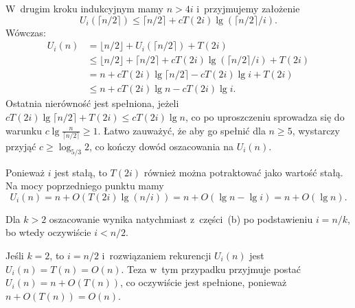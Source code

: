 W~drugim kroku indukcyjnym mamy $n>4i$ i~przyjmujemy założenie
\[
    U_i(\lceil n/2\rceil) \le \lceil n/2\rceil+cT(2i)\lg(\lceil n/2\rceil/i).
\]
Wówczas:
\begin{align*}
    U_i(n) &= \lfloor n/2\rfloor+U_i(\lceil n/2\rceil)+T(2i) \\
	&\le \lfloor n/2\rfloor+\lceil n/2\rceil+cT(2i)\lg(\lceil n/2\rceil/i)+T(2i) \\
	&= n+cT(2i)\lg\lceil n/2\rceil-cT(2i)\lg i+T(2i) \\
	&\le n+cT(2i)\lg n-cT(2i)\lg i.
\end{align*}
Ostatnia nierówność jest spełniona, jeżeli $cT(2i)\lg\lceil n/2\rceil+T(2i)\le cT(2i)\lg n$, co po uproszczeniu sprowadza się do warunku $c\lg\frac{n}{\lceil n/2\rceil}\ge1$. Łatwo zauważyć, że aby go spełnić dla $n\ge5$, wystarczy przyjąć $c\ge\log_{5/3}2$, co kończy dowód oszacowania na $U_i(n)$.

\subproblem %
Ponieważ $i$ jest stałą, to $T(2i)$ również można potraktować jako wartość stałą. Na mocy poprzedniego punktu mamy
\[
	U_i(n) = n+O(T(2i)\lg(n/i)) = n+O(\lg n-\lg i) = n+O(\lg n).
\]

\subproblem %
Dla $k>2$ oszacowanie wynika natychmiast z~części~(b) po podstawieniu $i=n/k$, bo wtedy oczywiście $i<n/2$.

Jeśli $k=2$, to $i=n/2$ i~rozwiązaniem rekurencji $U_i(n)$ jest $U_i(n)=T(n)=O(n)$. Teza w~tym przypadku przyjmuje postać $U_i(n)=n+O(T(n))$, co oczywiście jest spełnione, ponieważ $n+O(T(n))=O(n)$.

\endinput
